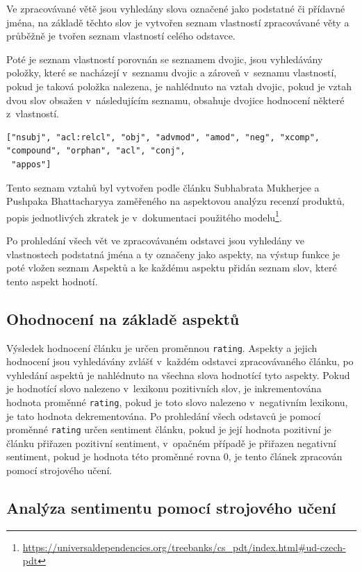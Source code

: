Ve zpracovávané větě jsou vyhledány slova označené jako podstatné či přídavné jména, na základě těchto slov je vytvořen seznam vlastností zpracovávané věty a průběžně je tvořen seznam vlastností celého odstavce. 

Poté je seznam vlastností porovnán se seznamem dvojic, jsou vyhledávány položky, které se nacházejí v~seznamu dvojic a zároveň v~seznamu vlastností, pokud je taková položka nalezena, je nahlédnuto na vztah dvojic, pokud je vztah dvou slov obsažen v~následujícím seznamu, obsahuje dvojice hodnocení některé z~vlastností.

\begin{lstlisting}[basicstyle=\small]
["nsubj", "acl:relcl", "obj", "advmod", "amod", "neg", "xcomp", "compound", "orphan", "acl", "conj",
 "appos"]
\end{lstlisting}

Tento seznam vztahů byl vytvořen podle článku Subhabrata Mukherjee a Pushpaka Bhattacharyya zaměřeného na aspektovou analýzu recenzí produktů\cite{mukherjee2012feture}, popis jednotlivých zkratek je v~dokumentaci použitého modelu\footnote{\url{https://universaldependencies.org/treebanks/cs\_pdt/index.html\#ud-czech-pdt}}.

Po prohledání všech vět ve zpracovávaném odstavci jsou vyhledány ve vlastnostech podstatná jména a ty označeny jako aspekty, na výstup funkce je poté vložen seznam Aspektů a ke každému aspektu přidán seznam slov, které tento aspekt hodnotí.

\subsection*{Ohodnocení na základě aspektů}
Výsledek hodnocení článku je určen proměnnou \verb|rating|. Aspekty a jejich hodnocení jsou vyhledávány zvlášť v~každém odstavci zpracovávaného článku, po vyhledání aspektů je nahlédnuto na všechna slova hodnotící tyto aspekty. Pokud je hodnotící slovo nalezeno v~lexikonu pozitivních slov, je inkrementována hodnota proměnné \verb|rating|, pokud je toto slovo nalezeno v~negativním lexikonu, je tato hodnota dekrementována. Po prohledání všech odstavců je pomocí proměnné \verb|rating| určen sentiment článku, pokud je její hodnota pozitivní je článku přiřazen pozitivní sentiment, v~opačném případě je přiřazen negativní sentiment, pokud je hodnota této proměnné rovna 0, je tento článek zpracován pomocí strojového učení.

\subsection*{Analýza sentimentu pomocí strojového učení}

